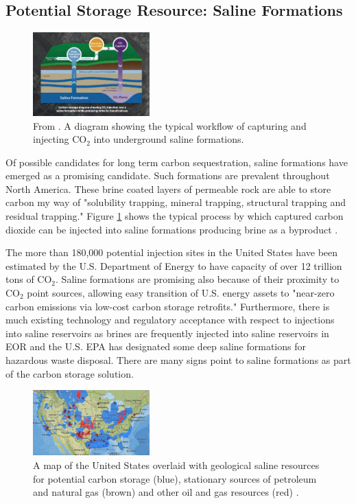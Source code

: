 \documentclass[letterpaper, 12pt]{article}
\begin{document}
\subsection{Potential Storage Resource: Saline Formations}
\setlength{\intextsep}{2pt}%
\begin{figure} %
    \centering
    \includegraphics[width=0.4\textwidth]{sdiag}
    \caption{\label{sdiagfig}  From \cite{atlas}. A diagram showing the typical workflow of capturing and injecting CO$_2$ into underground saline formations. }
\end{figure}

\par Of possible candidates for long term carbon sequestration, saline formations have emerged as a promising candidate. Such formations are prevalent throughout North America. These brine coated layers of permeable rock are able to store carbon my way of "solubility trapping, mineral trapping, structural trapping and residual trapping." Figure \ref{sdiagfig} shows the typical process by which captured carbon dioxide can be injected into saline formations producing brine as a byproduct \cite{atlas}. 

The more than 180,000 potential injection sites in the United States have been estimated by the U.S. Department of Energy to have capacity of over 12 trillion tons of CO$_2$. Saline formations are promising also because of their proximity to CO$_2$ point sources, allowing easy transition of U.S. energy assets to "near-zero carbon emissions via low-cost carbon storage retrofits." \cite{whysaline} Furthermore, there is much existing technology and regulatory acceptance with respect to injections into saline reservoirs as brines are frequently injected into saline reservoirs in EOR and the U.S. EPA has designated some deep saline formations for hazardous waste disposal. There are many signs point to saline formations as part of the carbon storage solution. 
\pagebreak
\setlength{\intextsep}{2pt}%
\begin{figure} %
    \centering
    \includegraphics[width=0.4\textwidth]{saline_tight}
    \caption{\label{salinetight} A map of the United States overlaid with geological saline resources for potential carbon storage (blue), stationary sources of petroleum and natural gas (brown) and other oil and gas resources (red) \cite{atlas}.}
\end{figure}
\end{document}
